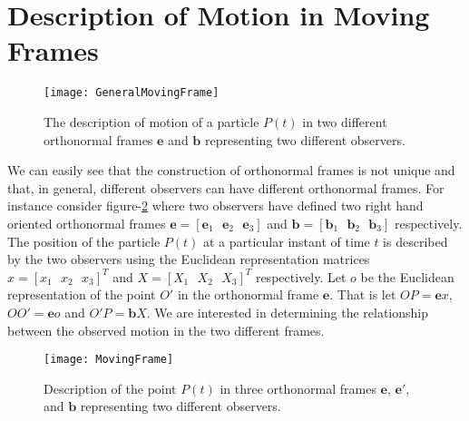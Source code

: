 \documentclass[graybox,envcountchap,sectrefs]{svmonoMuga}
\begin{document}
\section{Description of Motion in Moving Frames}\label{Secn:RelativeMotion}

\begin{figure}[ht]
\begin{center}
\texttt{[image: GeneralMovingFrame]}
\renewcommand{\baselinestretch}{1}\selectfont
\caption{The description of motion of a particle $P(t)$ in two different orthonormal frames $\mathbf{e}$ and $\mathbf{b}$ representing two different observers.}
\label{Fig:GeneralMovingFrame0}
\renewcommand{\baselinestretch}{1.5}\selectfont
\end{center}
\end{figure}

We can easily see that the construction of orthonormal frames is not unique and that, in general, different observers can have different orthonormal frames. For instance consider figure-\ref{Fig:GeneralMovingFrame} where two observers have defined two right hand oriented orthonormal frames $\mathbf{e}=[\mathbf{e}_1\:\:\: \mathbf{e}_2\:\:\: \mathbf{e}_3]$ and $\mathbf{b}=[\mathbf{b}_1\:\:\: \mathbf{b}_2\:\:\: \mathbf{b}_3]$ respectively. The position of the particle $P(t)$ at a particular instant of time $t$ is described by the two observers using the Euclidean representation matrices $x=[x_1\:\:\:x_2\:\:\:x_3]^T$ and $X=[X_1\:\:\:X_2\:\:\: X_3]^T$ respectively. Let $o$ be the Euclidean representation of the point $O'$ in the orthonormal frame $\mathbf{e}$. That is let $OP=\mathbf{e}x$, $OO'=\mathbf{e}o$ and $O'P=\mathbf{b}X$. We are interested in determining the relationship between the observed motion in the two different frames.


\begin{figure}[ht]
\begin{center}
\texttt{[image: MovingFrame]}
\renewcommand{\baselinestretch}{1}\selectfont
\caption{Description of the point $P(t)$ in three orthonormal frames $\mathbf{e}$, $\mathbf{e}'$, and $\mathbf{b}$ representing two different observers.}
\label{Fig:GeneralMovingFrame}
\renewcommand{\baselinestretch}{1.5}\selectfont
\end{center}
\end{figure}
\end{document}
